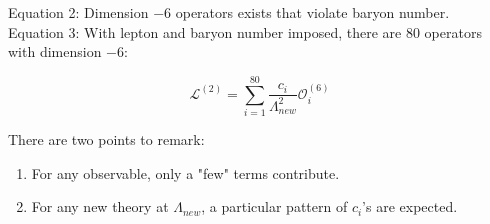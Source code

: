 \documentclass[10pt]{article}
\begin{document}
	Equation 2: Dimension $-6$ operators exists that violate baryon number.\\
	
	Equation 3: With lepton and baryon number imposed, there are 80 operators with dimension $-6$:
	
	\begin{equation}
		\mathcal{L}^{(2)} = \sum_{i=1}^{80}\frac{c_i}{\Lambda_{new}^2}\mathcal{O}_i^{(6)}
	\end{equation} 
	
	There are two points to remark:
	\begin{enumerate}
		\item For any observable, only a "few" terms contribute.
		\item For any new theory at $\Lambda_{new}$, a particular pattern of $c_i$'s are expected.
	\end{enumerate}
	
\end{document}
